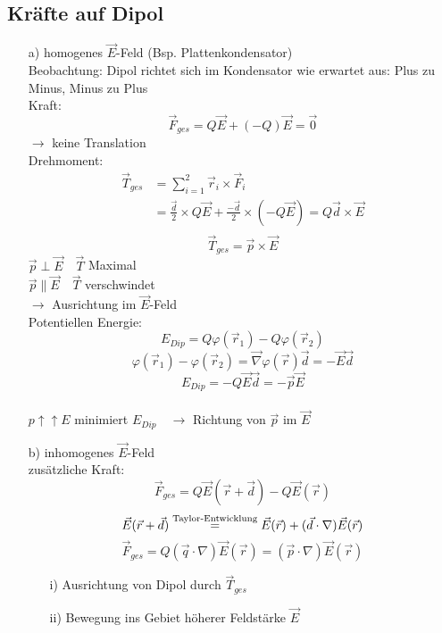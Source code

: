 \documentclass[titlepage,12pt,a4paper,ngerman]{report}
\begin{document}

\subsection{Kräfte auf Dipol}
\begin{itemize}
\item[a)] homogenes $\vec{E}$-Feld (Bsp. Plattenkondensator)\\
Beobachtung: Dipol richtet sich im Kondensator wie erwartet aus: Plus zu Minus, Minus zu Plus\\
Kraft: $$\vec{F}_{ges} = Q \vec{E} + (-Q) \vec{E} = \vec{0}$$ $\rightarrow$ keine Translation\\
Drehmoment: \begin{align*}
\vec{T}_{ges} & = \sum^2_{i=1} \vec{r}_i\times \vec{F}_i \\
& = \frac{\vec{d}}{2} \times Q\vec{E} + \frac{-\vec{d}}{2} \times (-Q\vec{E}) = Q \vec{d} \times \vec{E}\\
\end{align*}
$$\vec{T}_{ges} = \vec{p} \times \vec{E}$$
$\vec{p} \perp \vec{E} \quad \vec{T}$ Maximal\\
$ \vec{p} \parallel \vec{E} \quad \vec{T}$ verschwindet\\
$\rightarrow$ Ausrichtung im $\vec{E}$-Feld\\
Potentiellen Energie:\\
$$ E_{Dip}= Q \varphi(\vec{r}_1) - Q \varphi(\vec{r}_2)$$
$$\varphi(\vec{r}_1) - \varphi(\vec{r}_2) = \vec{\nabla} \varphi(\vec{r}) \vec{d} = -\vec{E} \vec{d}$$
$$E_{Dip} = - Q \vec{E}\vec{d} = - \vec{p} \vec{E}$$\\
$p \uparrow \uparrow E$ minimiert $E_{Dip} \quad \rightarrow$ Richtung von $\vec{p}$ im $\vec{E}$
\item[b)]inhomogenes $\vec{E}$-Feld \\
zusätzliche Kraft: $$\vec{F}_{ges} = Q \vec{E} (\vec{r}+\vec{d}) - Q \vec{E}(\vec{r})$$
$$\vec{E}(\vec{r}+\vec{d}) \buildrel \textrm{Taylor-Entwicklung} \over = \vec{E}(\vec{r}) + (\vec{d}\cdot \nabla ) \vec{E}(\vec{r})$$ 
$$\vec{F}_{ges} = Q ( \vec{q} \cdot \nabla ) \vec{E}(\vec{r}) = (\vec{p} \cdot \nabla ) \vec{E}(\vec{r})$$
\begin{itemize}
\item[i)] Ausrichtung von Dipol durch $\vec{T}_{ges}$
\item[ii)] Bewegung ins Gebiet höherer Feldstärke $\vec{E}$
\end{itemize}
\end{itemize}
\end{document}
